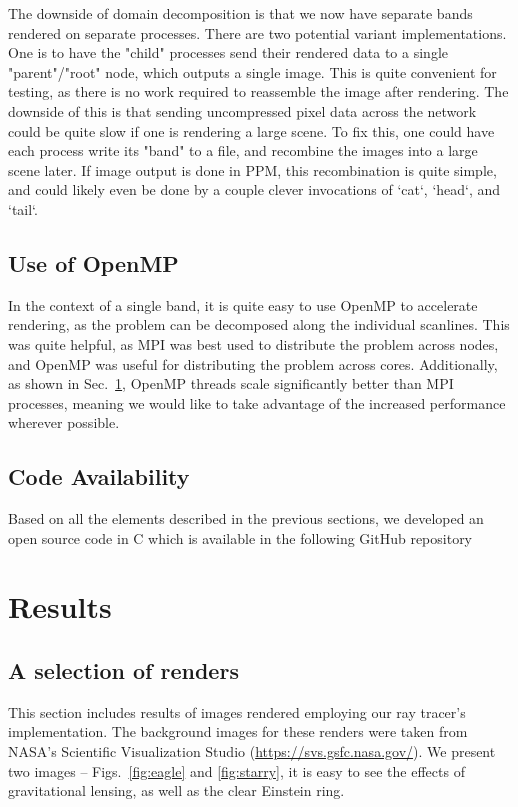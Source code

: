 The downside of domain decomposition is that we now have separate bands rendered on separate processes. There are two potential variant implementations. One is to have the "child" processes send their rendered data to a single "parent"/"root" node, which outputs a single image. This is quite convenient for testing, as there is no work required to reassemble the image after rendering. The downside of this is that sending uncompressed pixel data across the network could be quite slow if one is rendering a large scene. To fix this, one could have each process write its "band" to a file, and recombine the images into a large scene later. If image output is done in PPM, this recombination is quite simple, and could likely even be done by a couple clever invocations of `cat`, `head`, and `tail`.


\subsection{Use of OpenMP}
In the context of a single band, it is quite easy to use OpenMP \cite{660313_OMP} to accelerate rendering, as the problem can be decomposed along the individual scanlines. This was quite helpful, as MPI was best used to distribute the problem across nodes, and OpenMP was useful for distributing the problem across cores.
Additionally, as shown in Sec.~\ref{sec:results}, OpenMP threads scale significantly better than MPI processes, meaning we would like to take advantage of the increased performance wherever possible.


\subsection{Code Availability}
Based on all the elements described in the previous sections,
we developed an open source code in C which is available in the following
GitHub repository




\section{Results}
\label{sec:results}

\subsection{A selection of renders}

This section includes results of images rendered employing our ray tracer's implementation.
The background images for these renders were taken from NASA's Scientific Visualization Studio (\url{https://svs.gsfc.nasa.gov/}).
We present two images -- Figs.~\ref{fig:eagle} and \ref{fig:starry}, it is easy to see the effects of gravitational lensing, as well as the clear Einstein ring. 


